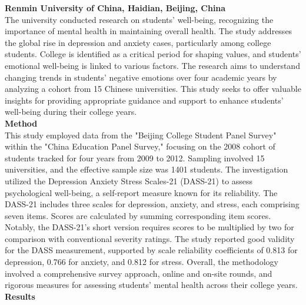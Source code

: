 \documentclass[11pt]{report}
\begin{document}
\textbf{Renmin University of China, Haidian, Beijing, China \cite{research-2}}
\\ \normalsize The university conducted research on students' well-being, recognizing the importance of mental health in maintaining overall health. The study addresses the global rise in depression and anxiety cases, particularly among college students. College is identified as a critical period for shaping values, and students' emotional well-being is linked to various factors. The research aims to understand changing trends in students' negative emotions over four academic years by analyzing a cohort from 15 Chinese universities. This study seeks to offer valuable insights for providing appropriate guidance and support to enhance students' well-being during their college  years.\vspace{5mm} \\
\textbf{Method} \\
This study employed data from the "Beijing College Student Panel Survey" within the "China Education Panel Survey," focusing on the 2008 cohort of students tracked for four years from 2009 to 2012. Sampling involved 15 universities, and the effective sample size was 1401 students. The investigation utilized the Depression Anxiety Stress Scales-21 (DASS-21) to assess psychological well-being, a self-report measure known for its reliability. The DASS-21 includes three scales for depression, anxiety, and stress, each comprising seven items. Scores are calculated by summing corresponding item scores. Notably, the DASS-21's short version requires scores to be multiplied by two for comparison with conventional severity ratings. The study reported good validity for the DASS measurement, supported by scale reliability coefficients of 0.813 for depression, 0.766 for anxiety, and 0.812 for stress. Overall, the methodology involved a comprehensive survey approach, online and on-site rounds, and rigorous measures for assessing students' mental health across their college years.\vspace{5mm} \\
\textbf{Results} \\
\end{document}

